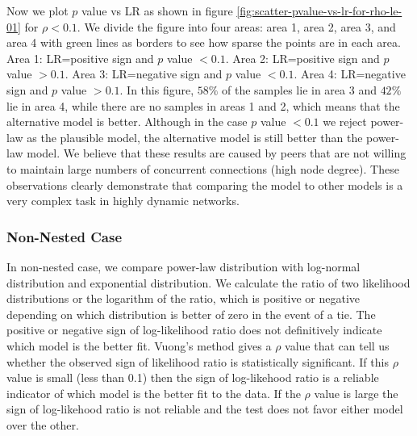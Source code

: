 \documentclass[paper]{ieice}
\begin{document}
Now we plot $p$ value vs LR as shown in figure \ref{fig:scatter-pvalue-vs-lr-for-rho-le-01} for $\rho < 0.1$.
We divide the figure into four areas: area 1, area 2, area 3, and area 4  with green lines as borders to see how sparse the points are in each area.
Area 1: LR=positive sign and $p$ value $<0.1$.
Area 2: LR=positive sign and $p$ value $>0.1$.
Area 3: LR=negative sign and $p$ value $<0.1$.
Area 4: LR=negative sign and $p$ value $>0.1$. 
In this figure, $58\%$ of the samples lie in area 3 and  $42\%$ lie in area 4, while there are no samples in areas 1 and 2, which means that the alternative model is better.
Although in the case $p$ value $<0.1$ we reject power-law as the plausible model, the alternative model is still better than the power-law model. 
We believe that these results are caused by peers that are not willing to maintain large numbers of concurrent connections (high node degree).
These observations clearly demonstrate that comparing the model to other models is a very complex task in highly dynamic networks.

\subsubsection{Non-Nested Case}
In non-nested case, we compare power-law distribution with log-normal distribution and exponential distribution.
We calculate the ratio of two likelihood distributions or the logarithm of the ratio, which is positive or negative depending on which distribution is better of zero in the event of a tie. 
The positive or negative sign of log-likelihood ratio does not definitively indicate which model is the better fit. 
Vuong's \cite{vuong1989likelihood}  method gives a $\rho$ value that can tell us whether the observed sign of likelihood ratio is statistically significant.
If this $\rho$ value is small (less than 0.1) then the sign of log-likehood ratio is a reliable indicator of which model is the better fit to the data. 
If the $\rho$ value is large the sign of log-likehood ratio is not reliable and the test does not favor either model over the other. 
\end{document}
